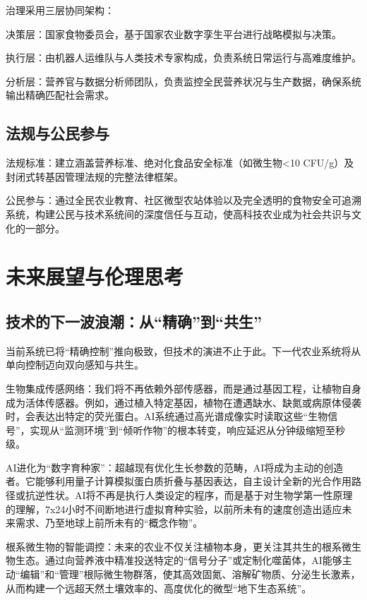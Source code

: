 治理采用三层协同架构：

决策层：国家食物委员会，基于国家农业数字孪生平台进行战略模拟与决策。

执行层：由机器人运维队与人类技术专家构成，负责系统日常运行与高难度维护。

分析层：营养官与数据分析师团队，负责监控全民营养状况与生产数据，确保系统输出精确匹配社会需求。

\subsection{法规与公民参与}\label{ux6cd5ux89c4ux4e0eux516cux6c11ux53c2ux4e0e}

法规标准：建立涵盖营养标准、绝对化食品安全标准（如微生物\textless10 CFU/g）及封闭式转基因管理法规的完整法律框架。

公民参与：通过全民农业教育、社区微型农站体验以及完全透明的食物安全可追溯系统，构建公民与技术系统间的深度信任与互动，使高科技农业成为社会共识与文化的一部分。

\section{未来展望与伦理思考}\label{ux672aux6765ux5c55ux671bux4e0eux4f26ux7406ux601dux8003}

\subsection{技术的下一波浪潮：从``精确''到``共生''}\label{ux6280ux672fux7684ux4e0bux4e00ux6ce2ux6d6aux6f6eux4eceux7cbeux786eux5230ux5171ux751f}

当前系统已将``精确控制''推向极致，但技术的演进不止于此。下一代农业系统将从单向控制迈向双向感知与共生。

生物集成传感网络：我们将不再依赖外部传感器，而是通过基因工程，让植物自身成为活体传感器。例如，通过植入特定基因，植物在遭遇缺水、缺氮或病原体侵袭时，会表达出特定的荧光蛋白。AI系统通过高光谱成像实时读取这些``生物信号''，实现从``监测环境''到``倾听作物''的根本转变，响应延迟从分钟级缩短至秒级。

AI进化为``数字育种家''：超越现有优化生长参数的范畴，AI将成为主动的创造者。它能够利用量子计算模拟蛋白质折叠与基因表达，自主设计全新的光合作用路径或抗逆性状。AI将不再是执行人类设定的程序，而是基于对生物学第一性原理的理解，7x24小时不间断地进行虚拟育种实验，以前所未有的速度创造出适应未来需求、乃至地球上前所未有的``概念作物''。

根系微生物的智能调控：未来的农业不仅关注植物本身，更关注其共生的根系微生物生态。通过向营养液中精准投送特定的``信号分子''或定制化噬菌体，AI能够主动``编辑''和``管理''根际微生物群落，使其高效固氮、溶解矿物质、分泌生长激素，从而构建一个远超天然土壤效率的、高度优化的微型``地下生态系统''。

